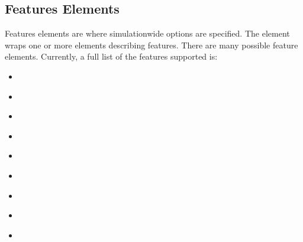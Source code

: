 \documentclass[letterpaper,10pt,english]{sphinxmanual}
\begin{document}
\subsection{Features Elements}
\label{\detokenize{reference_elements:features-elements}}\label{\detokenize{reference_elements:featureselement}}\label{\detokenize{reference_elements:index-5}}
\sphinxAtStartPar
Features elements are where simulation\sphinxhyphen{}wide options are specified. The  element wraps one or more elements describing features. There are many possible feature elements. Currently, a full list of the features supported is:
\begin{itemize}
\item {} 
\sphinxAtStartPar
{\hyperref[\detokenize{reference_elements:argumentselement}]{}}

\item {} 
\sphinxAtStartPar
{\hyperref[\detokenize{reference_elements:autovectorise}]{}}

\item {} 
\sphinxAtStartPar
{\hyperref[\detokenize{reference_elements:benchmark}]{}}

\item {} 
\sphinxAtStartPar
{\hyperref[\detokenize{reference_elements:bing}]{}}

\item {} 
\sphinxAtStartPar
{\hyperref[\detokenize{reference_elements:cflags}]{}}

\item {} 
\sphinxAtStartPar
{\hyperref[\detokenize{reference_elements:chunkedoutput}]{}}

\item {} 
\sphinxAtStartPar
{\hyperref[\detokenize{reference_elements:diagnostics}]{}}

\item {} 
\sphinxAtStartPar
{\hyperref[\detokenize{reference_elements:errorcheck}]{}}

\item {} 
\sphinxAtStartPar
{\hyperref[\detokenize{reference_elements:haltnonfinite}]{}}


\end{itemize}
\end{document}

